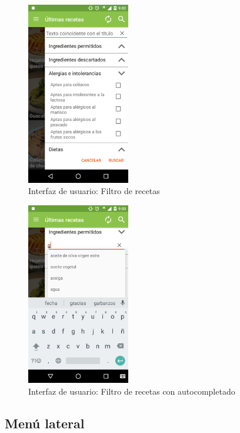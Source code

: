 \begin{figure}[htbp]
  \centering
  \includegraphics[width=0.4\textwidth]{cap5/img/captura_06}
  \caption{Interfaz de usuario: Filtro de recetas}
  \label{fig:captura_06}
\end{figure}

\begin{figure}[htbp]
  \centering
  \includegraphics[width=0.4\textwidth]{cap5/img/captura_07}
  \caption{Interfaz de usuario: Filtro de recetas con autocompletado}
  \label{fig:captura_07}
\end{figure}


\subsection{Menú lateral}

